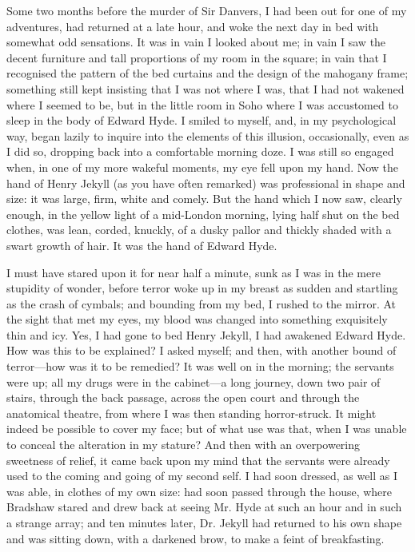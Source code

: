 \documentclass[]{novel}
\begin{document}
Some two months before the murder of Sir Danvers, I had been out for one of my adventures, had returned at a late hour, and woke the next day in bed with somewhat odd sensations. It was in vain I looked about me; in vain I saw the decent furniture and tall proportions of my room in the square; in vain that I recognised the pattern of the bed curtains and the design of the mahogany frame; something still kept insisting that I was not where I was, that I had not wakened where I seemed to be, but in the little room in Soho where I was accustomed to sleep in the body of Edward Hyde. I smiled to myself, and, in my psychological way, began lazily to inquire into the elements of this illusion, occasionally, even as I did so, dropping back into a comfortable morning doze. I was still so engaged when, in one of my more wakeful moments, my eye fell upon my hand. Now the hand of Henry Jekyll (as you have often remarked) was professional in shape and size: it was large, firm, white and comely. But the hand which I now saw, clearly enough, in the yellow light of a mid-London morning, lying half shut on the bed clothes, was lean, corded, knuckly, of a dusky pallor and thickly shaded with a swart growth of hair. It was the hand of Edward Hyde.

I must have stared upon it for near half a minute, sunk as I was in the mere stupidity of wonder, before terror woke up in my breast as sudden and startling as the crash of cymbals; and bounding from my bed, I rushed to the mirror. At the sight that met my eyes, my blood was changed into something exquisitely thin and icy. Yes, I had gone to bed Henry Jekyll, I had awakened Edward Hyde. How was this to be explained? I asked myself; and then, with another bound of terror—how was it to be remedied? It was well on in the morning; the servants were up; all my drugs were in the cabinet—a long journey, down two pair of stairs, through the back passage, across the open court and through the anatomical theatre, from where I was then standing horror-struck. It might indeed be possible to cover my face; but of what use was that, when I was unable to conceal the alteration in my stature? And then with an overpowering sweetness of relief, it came back upon my mind that the servants were already used to the coming and going of my second self. I had soon dressed, as well as I was able, in clothes of my own size: had soon passed through the house, where Bradshaw stared and drew back at seeing Mr. Hyde at such an hour and in such a strange array; and ten minutes later, Dr. Jekyll had returned to his own shape and was sitting down, with a darkened brow, to make a feint of breakfasting.
\end{document}
